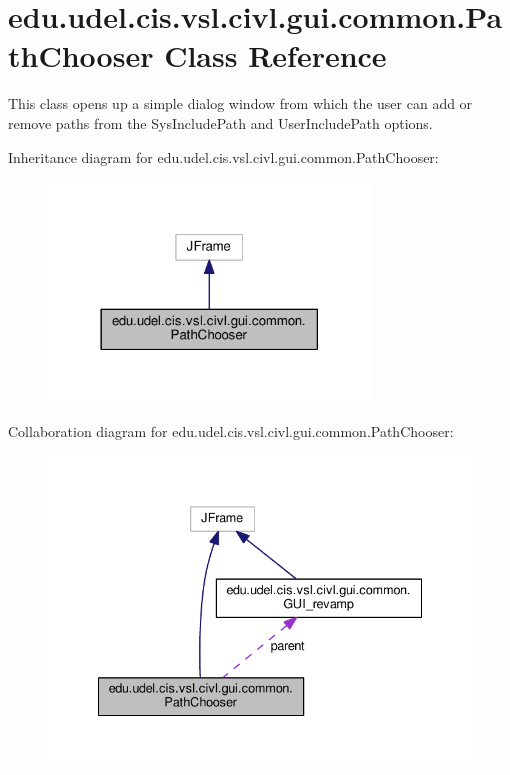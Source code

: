 \hypertarget{classedu_1_1udel_1_1cis_1_1vsl_1_1civl_1_1gui_1_1common_1_1PathChooser}{}\section{edu.\+udel.\+cis.\+vsl.\+civl.\+gui.\+common.\+Path\+Chooser Class Reference}
\label{classedu_1_1udel_1_1cis_1_1vsl_1_1civl_1_1gui_1_1common_1_1PathChooser}


This class opens up a simple dialog window from which the user can add or remove paths from the Sys\+Include\+Path and User\+Include\+Path options.  




Inheritance diagram for edu.\+udel.\+cis.\+vsl.\+civl.\+gui.\+common.\+Path\+Chooser\+:
\nopagebreak
\begin{figure}[H]
\begin{center}
\leavevmode
\includegraphics[width=242pt]{classedu_1_1udel_1_1cis_1_1vsl_1_1civl_1_1gui_1_1common_1_1PathChooser__inherit__graph}
\end{center}
\end{figure}


Collaboration diagram for edu.\+udel.\+cis.\+vsl.\+civl.\+gui.\+common.\+Path\+Chooser\+:
\nopagebreak
\begin{figure}[H]
\begin{center}
\leavevmode
\includegraphics[width=335pt]{classedu_1_1udel_1_1cis_1_1vsl_1_1civl_1_1gui_1_1common_1_1PathChooser__coll__graph}
\end{center}
\end{figure}
